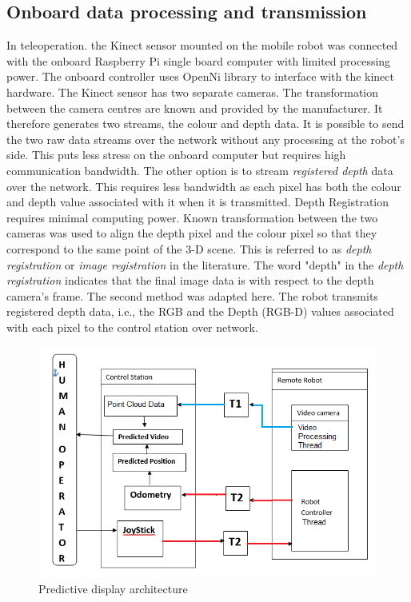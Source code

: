 \subsection{Onboard data processing and transmission}
In teleoperation. the Kinect sensor mounted on the mobile robot was connected with the onboard Raspberry Pi single board computer with limited processing power. The onboard controller uses OpenNi library to interface with the kinect hardware.  The Kinect sensor has two separate cameras. The transformation between the camera centres are known and provided by the manufacturer. It therefore generates two streams, the colour and depth data. It is possible to send the two raw data streams over the network  without any processing at the robot's side. This  puts less stress on the onboard computer but requires high communication bandwidth. The other option is to stream \textit{ registered depth} data over the network. This requires less bandwidth as each pixel has both the colour and depth value associated with it when it is transmitted. Depth Registration requires minimal computing power. Known transformation between the two cameras was used to align the depth pixel and the colour pixel so that they correspond to the same point of the 3-D scene. This is referred to as \textit{depth registration} or \textit{image registration} in the literature. The word "depth" in the   \textit{depth registration} indicates  that the final image data is with respect to  the depth camera's frame. The second method was adapted here. The robot transmits registered depth data, i.e., the RGB and the Depth (RGB-D) values associated with each pixel to the control station over network. 


\begin{figure}
	\includegraphics[width=\linewidth,keepaspectratio]{Chapter7/fig/PredictorBlockDig}
	\caption{Predictive display architecture}	\label{fig:PDBLock}
\end{figure}

